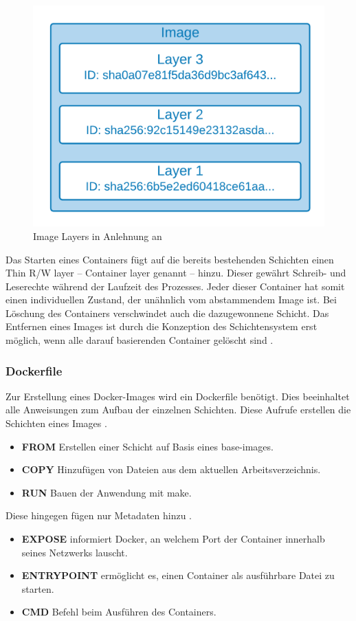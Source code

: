 \begin{figure}
    \centering
    \includegraphics[width=0.5\columnwidth]{images/Image-Layer.png}
    \caption{Image Layers in Anlehnung an \protect\cite[S.61]{dockerdeep}}
    \label{fig:dockerlayer}
\end{figure}


Das Starten eines Containers fügt auf die bereits bestehenden Schichten einen \glqq Thin R/W layer\grqq{} 
-- \glqq Container layer\grqq{} genannt -- hinzu. Dieser gewährt Schreib- und Leserechte während der Laufzeit des Prozesses. 
Jeder dieser Container hat somit einen individuellen Zustand, der unähnlich vom abstammendem Image ist.
Bei Löschung des Containers verschwindet auch die dazugewonnene Schicht.
Das Entfernen eines Images ist durch die Konzeption des Schichtensystem erst möglich, wenn alle darauf
basierenden Container gelöscht sind \cite{dockerstoragedriver}.

\subsubsection{Dockerfile}
Zur Erstellung eines Docker-Images wird ein Dockerfile benötigt. Dies beeinhaltet alle Anweisungen
zum Aufbau der einzelnen Schichten. 
Diese Aufrufe erstellen die Schichten eines Images \cite{dockerbestpracticedockerfile}.
\begin{itemize}
    \item \textbf{FROM} Erstellen einer Schicht auf Basis eines base-images. 
    \item \textbf{COPY} Hinzufügen von Dateien aus dem aktuellen Arbeitsverzeichnis. 
    \item \textbf{RUN} Bauen der Anwendung mit make. 
\end{itemize}
Diese hingegen fügen nur Metadaten hinzu \cite{dockerbestpracticedockerfile}.
\begin{itemize}
    \item \textbf{EXPOSE} informiert Docker, an welchem Port der Container innerhalb seines Netzwerks lauscht.
    \item \textbf{ENTRYPOINT} ermöglicht es, einen Container als ausführbare Datei zu starten.
    \item \textbf{CMD} Befehl beim Ausführen des Containers.
\end{itemize}


